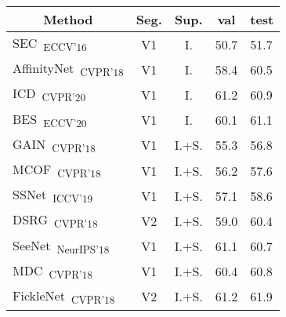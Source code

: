 \documentclass[final]{cvpr}
\begin{document}
\begin{table}[]
\normalsize
\centering
{\small
\begin{tabular}{@{}lccll@{}}
\toprule
\multicolumn{1}{c}{Method}                                                              & Seg.      & Sup.  & \multicolumn{1}{c}{val} & \multicolumn{1}{c}{test} \\ \midrule
\multicolumn{1}{l}{SEC~\cite{kolesnikov2016seed}\textsubscript{ECCV'16}}                & V1        & I.    & 50.7                    & 51.7                     \\
\multicolumn{1}{l}{AffinityNet~\cite{ahn2018learning}\textsubscript{CVPR'18}}           & V1        & I.    & 58.4                    & 60.5                     \\
\multicolumn{1}{l}{ICD~\cite{fan2020learning}\textsubscript{CVPR'20}}                   & V1        & I.    & 61.2                    & 60.9                     \\
\multicolumn{1}{l}{BES~\cite{chen2020boundary}\textsubscript{ECCV'20}}                  & V1        & I.    & 60.1                    & 61.1                     \\
\multicolumn{1}{l}{GAIN~\cite{li2018tell}\textsubscript{CVPR'18}}                       & V1        & I.+S. & 55.3                    & 56.8                     \\
\multicolumn{1}{l}{MCOF~\cite{wang2018weakly}\textsubscript{CVPR'18}}                   & V1        & I.+S. & 56.2                    & 57.6                     \\
\multicolumn{1}{l}{SSNet~\cite{zeng2019joint}\textsubscript{ICCV'19}}                   & V1        & I.+S. & 57.1                    & 58.6                     \\
\multicolumn{1}{l}{DSRG~\cite{huang2018weakly}\textsubscript{CVPR'18}}                  & V2        & I.+S. & 59.0                    & 60.4                     \\
\multicolumn{1}{l}{SeeNet~\cite{hou2018self}\textsubscript{NeurIPS'18}}                 & V1        & I.+S. & 61.1                    & 60.7                     \\
\multicolumn{1}{l}{MDC~\cite{wei2018revisiting}\textsubscript{CVPR'18}}                 & V1        & I.+S. & 60.4                    & 60.8                     \\
\multicolumn{1}{l}{FickleNet~\cite{lee2019ficklenet}\textsubscript{CVPR'18}}            & V2        & I.+S. & 61.2                    & 61.9                     \\

\end{tabular}}
\end{table}
\end{document}
